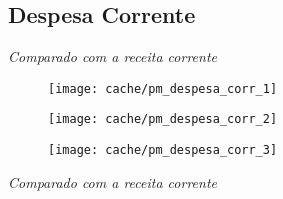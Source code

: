 
\subsection{Despesa Corrente}






\textit{Comparado com a receita corrente}

\begin{figure}[H]
\center
\texttt{[image: cache/pm\_despesa\_corr\_1]}
\end{figure}

\begin{figure}[H]
\center
\texttt{[image: cache/pm\_despesa\_corr\_2]}
\end{figure}

\begin{figure}[H]
\center
\texttt{[image: cache/pm\_despesa\_corr\_3]}
\end{figure}

\textit{Comparado com a receita corrente}
